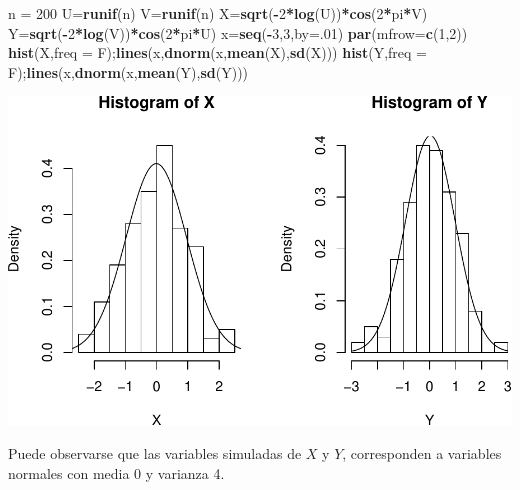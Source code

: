 \documentclass[]{article}
\newenvironment{Shaded}{\begin{snugshade}}{\end{snugshade}}
\newcommand{\KeywordTok}[1]{\textcolor[rgb]{0.13,0.29,0.53}{\textbf{#1}}}
\newcommand{\DataTypeTok}[1]{\textcolor[rgb]{0.13,0.29,0.53}{#1}}
\newcommand{\DecValTok}[1]{\textcolor[rgb]{0.00,0.00,0.81}{#1}}
\newcommand{\StringTok}[1]{\textcolor[rgb]{0.31,0.60,0.02}{#1}}
\newcommand{\OperatorTok}[1]{\textcolor[rgb]{0.81,0.36,0.00}{\textbf{#1}}}
\newcommand{\NormalTok}[1]{#1}
\begin{document}
\begin{Shaded}
\begin{Highlighting}[]
\NormalTok{n =}\StringTok{ }\DecValTok{200}
\NormalTok{U=}\KeywordTok{runif}\NormalTok{(n)}
\NormalTok{V=}\KeywordTok{runif}\NormalTok{(n)}
\NormalTok{X=}\KeywordTok{sqrt}\NormalTok{(}\OperatorTok{-}\DecValTok{2}\OperatorTok{*}\KeywordTok{log}\NormalTok{(U))}\OperatorTok{*}\KeywordTok{cos}\NormalTok{(}\DecValTok{2}\OperatorTok{*}\NormalTok{pi}\OperatorTok{*}\NormalTok{V)}
\NormalTok{Y=}\KeywordTok{sqrt}\NormalTok{(}\OperatorTok{-}\DecValTok{2}\OperatorTok{*}\KeywordTok{log}\NormalTok{(V))}\OperatorTok{*}\KeywordTok{cos}\NormalTok{(}\DecValTok{2}\OperatorTok{*}\NormalTok{pi}\OperatorTok{*}\NormalTok{U)}
\NormalTok{x=}\KeywordTok{seq}\NormalTok{(}\OperatorTok{-}\DecValTok{3}\NormalTok{,}\DecValTok{3}\NormalTok{,}\DataTypeTok{by=}\NormalTok{.}\DecValTok{01}\NormalTok{)}
\KeywordTok{par}\NormalTok{(}\DataTypeTok{mfrow=}\KeywordTok{c}\NormalTok{(}\DecValTok{1}\NormalTok{,}\DecValTok{2}\NormalTok{))}
\KeywordTok{hist}\NormalTok{(X,}\DataTypeTok{freq =}\NormalTok{ F);}\KeywordTok{lines}\NormalTok{(x,}\KeywordTok{dnorm}\NormalTok{(x,}\KeywordTok{mean}\NormalTok{(X),}\KeywordTok{sd}\NormalTok{(X)))}
\KeywordTok{hist}\NormalTok{(Y,}\DataTypeTok{freq =}\NormalTok{ F);}\KeywordTok{lines}\NormalTok{(x,}\KeywordTok{dnorm}\NormalTok{(x,}\KeywordTok{mean}\NormalTok{(Y),}\KeywordTok{sd}\NormalTok{(Y)))}
\end{Highlighting}
\end{Shaded}

\includegraphics{notebook_simulaciones_files/figure-latex/unnamed-chunk-12-1.pdf}

Puede observarse que las variables simuladas de \(X\) y \(Y\),
corresponden a variables normales con media 0 y varianza 4.
\end{document}

